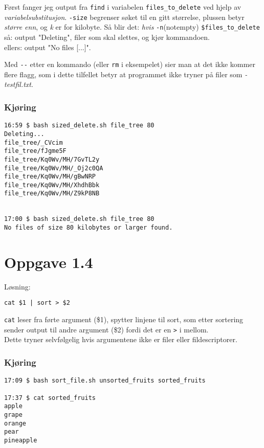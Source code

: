 \documentclass{article}
\newcommand{\code}[1]{\colorbox{codegray}{\texttt{#1}}}
\begin{document}
Først fanger jeg output fra \code{find} i variabelen \code{files\_to\_delete}
ved hjelp av \textit{variabelsubstitusjon}.
\code{-size} begrenser søket til en gitt størrelse, plussen betyr \textit{større enn},
og \textit{k} er for kilobyte.
Så blir det: \textit{hvis} \code{-n}(notempty) \code{\$files\_to\_delete}
så: output "Deleting", filer som skal slettes, og kjør kommandoen. \\
ellers: output "No files [...]".

Med \code{-\--} etter en kommando (eller \code{rm} i eksempelet) sier man at det ikke kommer flere flagg,
som i dette tilfellet betyr at programmet ikke tryner på filer som \textit{-testfil.txt}.

\subsubsection*{Kjøring}
\begin{Verbatim}
16:59 $ bash sized_delete.sh file_tree 80
Deleting...
file_tree/_CVcim
file_tree/fJgme5F
file_tree/Kq0Wv/MH/7GvTL2y
file_tree/Kq0Wv/MH/_Oj2c0QA
file_tree/Kq0Wv/MH/gBwNRP
file_tree/Kq0Wv/MH/XhdhBbk
file_tree/Kq0Wv/MH/Z9kP8NB


17:00 $ bash sized_delete.sh file_tree 80
No files of size 80 kilobytes or larger found.
\end{Verbatim}


\section*{Oppgave 1.4}

Løsning:
\begin{verbatim}
cat $1 | sort > $2
\end{verbatim}

\code{cat} leser fra førte argument (\$1), spytter linjene til sort,
som etter sortering sender output til andre argument (\$2) fordi det
er en \code{>} i mellom.\\

Dette tryner selvfølgelig hvis argumentene ikke er filer eller fildescriptorer.

\subsubsection*{Kjøring}

\begin{Verbatim}
17:09 $ bash sort_file.sh unsorted_fruits sorted_fruits

17:37 $ cat sorted_fruits
apple
grape
orange
pear
pineapple
\end{Verbatim}
\end{document}
